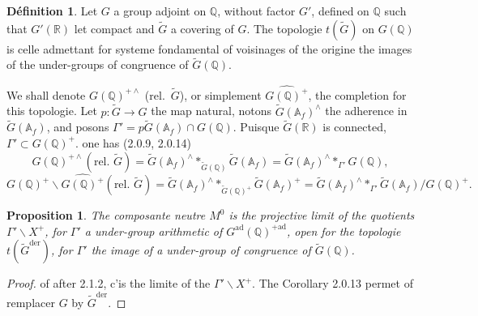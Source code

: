 \documentclass[12pt,a4paper]{article}
\theoremstyle{plain}
\newtheorem{proposition}[theorem]{Proposition}
\theoremstyle{definition}
\newtheorem{definition}[theorem]{D\'efinition}
\theoremstyle{remark}
\newcommand{\QQ}{\mathbb{Q}}
\newcommand{\RR}{\mathbb{R}}
\newcommand{\Af}{\mathbb{A}_f}
\begin{document}
\begin{definition}
Let $G$ a group adjoint on $\QQ$, without factor $G'$, defined on $\QQ$ such that $G'(\RR)$ let compact and $\tilde{G}$ a covering of $G$. The topologie $t(\tilde{G})$ on $G(\QQ)$ is celle admettant for systeme fondamental of voisinages of the origine the images of the under-groups of congruence of $\tilde{G}(\QQ)$.

We shall denote $G(\QQ)^{+\wedge}$ (rel.~$\tilde{G}$), or simplement $\widehat{G(\QQ)^+}$, the completion for this topologie. Let $p:\tilde{G} \to G$ the map natural, notons $\tilde{G}(\Af)^{\wedge}$ the adherence in $\tilde{G}(\Af)$, and posons $\Gamma' = p\tilde{G}(\Af) \cap G(\QQ)$. Puisque $\tilde{G}(\RR)$ is connected, $\Gamma' \subset G(\QQ)^+$. one has (2.0.9, 2.0.14)
\begin{equation}\label{eq:2.1.6.1}
G(\QQ)^{+\wedge}(\text{rel.~}\tilde{G}) = \tilde{G}(\Af)^{\wedge} *_{\tilde{G}(\QQ)} \tilde{G}(\Af) = \tilde{G}(\Af)^{\wedge} *_{\Gamma'} G(\QQ),
\end{equation}
\begin{equation}\label{eq:2.1.6.2}
G(\QQ)^+\backslash\widehat{G(\QQ)^+}(\text{rel.~}\tilde{G}) = \tilde{G}(\Af)^{\wedge} *_{\tilde{G}(\QQ)^+} \tilde{G}(\Af)^+ = \tilde{G}(\Af)^{\wedge} *_{\Gamma'} \tilde{G}(\Af)/G(\QQ)^+.
\end{equation}
\end{definition}

\begin{proposition}
The composante neutre $M^0$ is the projective limit of the quotients $\Gamma'\backslash X^+$, for $\Gamma'$ a under-group arithmetic of $G^{\text{ad}}(\QQ)^{+\text{ad}}$, open for the topologie $t(\tilde{G}^{\text{der}})$, for $\Gamma'$ the image of a under-group of congruence of $\tilde{G}(\QQ)$.
\end{proposition}

\begin{proof}
of after 2.1.2, c'is the limite of the $\Gamma'\backslash X^+$. The Corollary 2.0.13 permet of remplacer $G$ by $\tilde{G}^{\text{der}}$.
\end{proof}

\subsubsection{}
\end{document}
